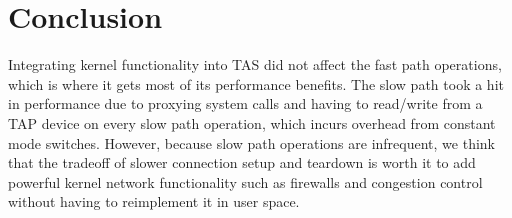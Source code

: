 \section{Conclusion}\label{Conclusion}


Integrating kernel functionality into TAS did not affect the fast path operations, which is where
it gets most of its performance benefits.
The slow path took a hit in performance due to proxying system calls and having to 
read/write from a TAP device on every slow path
operation, which incurs overhead from constant mode switches.
However, because slow path operations are infrequent, we think that the tradeoff of slower connection setup
and teardown is worth it to add powerful kernel network functionality such as firewalls and congestion control without
having to reimplement it in user space.



